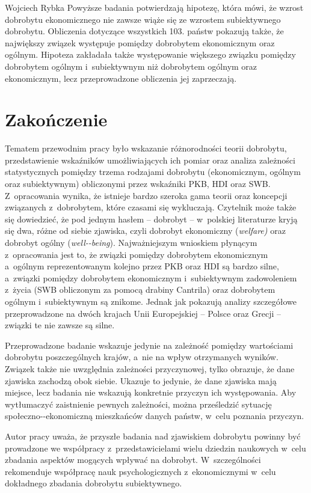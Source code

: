 \begin{artplenv}{Wojciech Rybka}
Powyższe badania potwierdzają hipotezę, która mówi, że wzrost dobrobytu ekonomicznego nie zawsze wiąże się
ze wzrostem subiektywnego dobrobytu. Obliczenia dotyczące wszystkich 103. państw pokazują także, że największy związek
występuje pomiędzy dobrobytem ekonomicznym oraz ogólnym. Hipoteza zakładała także występowanie większego związku
pomiędzy dobrobytem ogólnym i~subiektywnym niż dobrobytem ogólnym oraz ekonomicznym, lecz przeprowadzone obliczenia jej
zaprzeczają.

\section{Zakończenie}
Tematem przewodnim pracy było wskazanie różnorodności teorii dobrobytu, przedstawienie wskaźników
umożliwiających ich pomiar oraz analiza zależności statystycznych pomiędzy trzema rodzajami dobrobytu (ekonomicznym,
ogólnym oraz subiektywnym) obliczonymi przez wskaźniki PKB, HDI oraz SWB. Z~opracowania wynika, że istnieje bardzo
szeroka gama teorii oraz koncepcji związanych z~dobrobytem, które czasami się wykluczają. Czytelnik może także się
dowiedzieć, że pod jednym hasłem -- dobrobyt -- w~polskiej literaturze kryją się dwa, różne od siebie zjawiska, czyli
dobrobyt ekonomiczny (\textit{welfare)} oraz dobrobyt ogólny (\textit{well-\mbox{-being}}). Najważniejszym wnioskiem
płynącym z~opracowania jest to, że związki pomiędzy dobrobytem ekonomicznym a~ogólnym reprezentowanym kolejno przez PKB
oraz HDI są bardzo silne, a~związki pomiędzy dobrobytem ekonomicznym i~subiektywnym zadowoleniem z~życia (SWB
obliczonym za pomocą drabiny Cantrila) oraz dobrobytem ogólnym i~subiektywnym są znikome. Jednak jak pokazują analizy
szczegółowe przeprowadzone na dwóch krajach Unii Europejskiej -- Polsce oraz Grecji -- związki te nie zawsze są silne. 

Przeprowadzone badanie wskazuje jedynie na zależność pomiędzy wartościami dobrobytu poszczególnych krajów, a~nie na
wpływ otrzymanych wyników. Związek także nie uwzględnia zależności przyczynowej, tylko obrazuje, że dane zjawiska zachodzą obok
siebie. Ukazuje to jedynie, że dane zjawiska mają miejsce, lecz badania nie wskazują konkretnie przyczyn ich
występowania. Aby wytłumaczyć zaistnienie pewnych zależności, można prześledzić sytuację społeczno-\mbox{-ekonomiczną}
mieszkańców danych państw, w~celu poznania przyczyn. 

Autor pracy uważa, że przyszłe badania nad zjawiskiem dobrobytu powinny być prowadzone we współpracy z~przedstawicielami
wielu dziedzin naukowych w~celu zbadania aspektów mogących wpływać na dobrobyt. W~szczególności rekomenduje współpracę
nauk psychologicznych z~ekonomicznymi w~celu dokładnego zbadania dobrobytu subiektywnego.

\end{artplenv}\label{rybka-stop}

